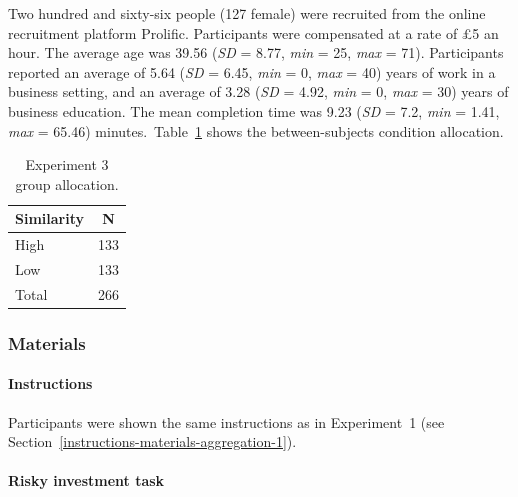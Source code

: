 \documentclass[a4paper, nobind, dvipsnames]{templates/ociamthesis}
\theoremstyle{definition}
\theoremstyle{definition}
\theoremstyle{definition}
\theoremstyle{definition}
\theoremstyle{remark}
\begin{document}
Two hundred and sixty-six people (127 female) were recruited from the online recruitment platform Prolific. Participants were compensated at a rate of £5 an hour. The average age was 39.56 (\emph{SD} = 8.77, \emph{min} = 25, \emph{max} = 71). Participants reported an average of 5.64 (\emph{SD} = 6.45, \emph{min} = 0, \emph{max} = 40) years of work in a business setting, and an average of 3.28 (\emph{SD} = 4.92, \emph{min} = 0, \emph{max} = 30) years of business education. The mean completion time was 9.23 (\emph{SD} = 7.2, \emph{min} = 1.41, \emph{max} = 65.46) minutes.~Table~\ref{tab:condition-allocation-aggregation-3}
shows the between-subjects condition allocation.

\begin{table}[tbp]

\begin{center}
\begin{threeparttable}

\caption{\label{tab:condition-allocation-aggregation-3}Experiment 3 group allocation.}

\begin{tabular}{ll}
\toprule
Similarity & \multicolumn{1}{c}{N}\\
\midrule
High & 133\\
Low & 133\\
Total & 266\\
\bottomrule
\end{tabular}

\end{threeparttable}
\end{center}

\end{table}

\subsubsection{Materials}

\paragraph{Instructions}

Participants were shown the same instructions as in Experiment~1 (see
Section~\ref{instructions-materials-aggregation-1}).

\hypertarget{task-aggregation-3}{%
\paragraph{Risky investment task}\label{task-aggregation-3}}
\end{document}
